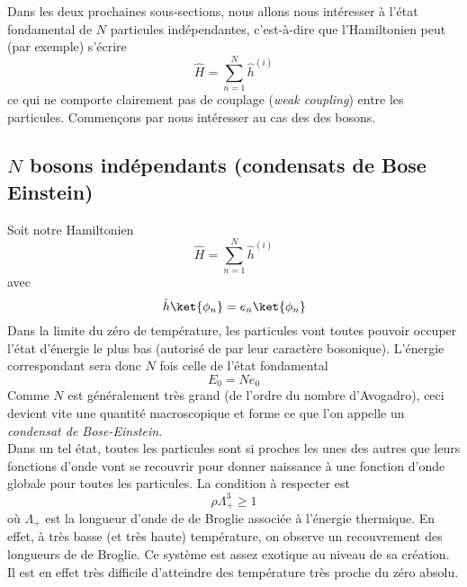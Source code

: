Dans les deux prochaines sous-sections, nous allons nous intéresser à l'état fondamental de 
$N$ particules indépendantes, c'est-à-dire que l'Hamiltonien peut (par exemple) s'écrire
\begin{equation}
\hat{H} = \sum_{n=1}^N \hat{h}^{(i)}
\end{equation}
ce qui ne comporte clairement pas de couplage (\textit{weak coupling}) entre les particules. 
Commençons par nous intéresser au cas des des bosons.

\subsection{$N$ bosons indépendants (condensats de Bose Einstein)}
Soit notre Hamiltonien 
\begin{equation}
\hat{H} = \sum_{n=1}^N \hat{h}^{(i)}
\end{equation}
avec
\begin{equation}
\hat{h}\ket{\phi_n} = e_n\ket{\phi_n}
\end{equation}
Dans la limite du zéro de température, les particules vont toutes pouvoir occuper l'état d'énergie 
le plus bas (autorisé de par leur caractère bosonique). L'énergie correspondant sera donc $N$ fois 
celle de l'état fondamental
\begin{equation}
E_0 = Ne_0
\end{equation}
Comme $N$ est généralement très grand (de l'ordre du nombre d'Avogadro), ceci devient vite une quantité
macroscopique et forme ce que l'on appelle un \textit{condensat de Bose-Einstein}.\\

Dans un tel état, toutes les particules sont si proches les unes des autres que leurs fonctions d'onde 
vont se recouvrir pour donner naissance à une fonction d'onde globale pour toutes les particules. La condition 
à respecter est 
\begin{equation}
\rho\Lambda_+^3 \geq 1
\end{equation}
où $\Lambda_+$ est la longueur d'onde de de Broglie associée à l'énergie thermique.  En effet, à très basse (et 
très  haute) température, on observe un recouvrement des longueurs de de Broglie. Ce système est assez exotique au 
niveau de sa création. Il est en effet très difficile d'atteindre des température très proche du zéro absolu.







